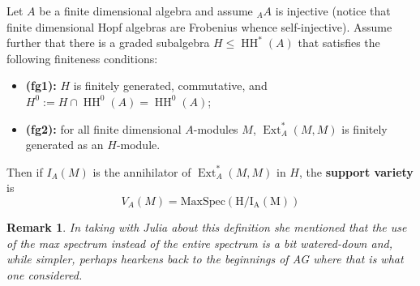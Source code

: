 \documentclass[12pt]{article}
\theoremstyle{nonumberbreak}
\theoremstyle{changebreak}
\theoremstyle{nonumberplain}
\theoremstyle{change}
\newtheorem{rmk}[thm]{Remark}
\DeclareMathOperator{\Ext}{Ext}
\DeclareMathOperator{\HH}{HH}
\begin{document}
\begin{defn}\label{def-support-var}
	Let $A$ be a finite dimensional algebra and assume $_AA$ is injective (notice that finite dimensional Hopf algebras are
	Frobenius whence self-injective). Assume further that there is a graded subalgebra $H\le \HH^*(A)$ that satisfies the following 
	finiteness conditions:
	\begin{itemize}
		\item \textbf{(fg1):} $H$ is finitely generated, commutative, and $H^0:=H\cap \HH^0(A)=\HH^0(A)$;
		\item \textbf{(fg2):} for all finite dimensional $A$-modules $M$, $\Ext^*_A(M,M)$ is finitely generated as an $H$-module.
	\end{itemize}

	Then if $I_A(M)$ is the annihilator of $\Ext_A^*(M,M)$ in $H$, the \textbf{support variety} is
	\[V_A(M)=\operatorname{MaxSpec(H/I_A(M))}\]
\end{defn}
\begin{rmk}
	In taking with Julia about this definition she mentioned that the use of the max spectrum instead of the entire
	spectrum is a bit watered-down and, while simpler, perhaps hearkens back to the beginnings of AG where that is what one considered.
\end{rmk}
\end{document}
